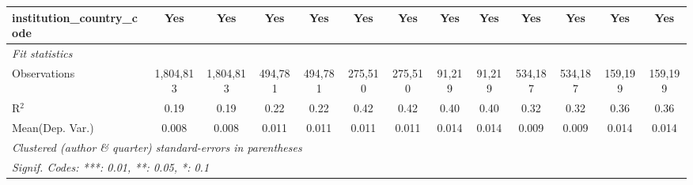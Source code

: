 \begin{tabular}{lcccccccccccc}
   institution\_country\_code               & Yes            & Yes            & Yes            & Yes             & Yes           & Yes           & Yes     & Yes           & Yes            & Yes            & Yes            & Yes\\  
   \midrule
   \emph{Fit statistics}\\
   Observations                             & 1,804,813      & 1,804,813      & 494,781        & 494,781         & 275,510       & 275,510       & 91,219  & 91,219        & 534,187        & 534,187        & 159,199        & 159,199\\  
   R$^2$                                    & 0.19           & 0.19           & 0.22           & 0.22            & 0.42          & 0.42          & 0.40    & 0.40          & 0.32           & 0.32           & 0.36           & 0.36\\  
Mean(Dep. Var.) & 0.008 & 0.008 & 0.011 & 0.011 & 0.011 & 0.011 & 0.014 & 0.014 & 0.009 & 0.009 & 0.014 & 0.014 \\
   \midrule \midrule
   \multicolumn{13}{l}{\emph{Clustered (author \& quarter) standard-errors in parentheses}}\\
   \multicolumn{13}{l}{\emph{Signif. Codes: ***: 0.01, **: 0.05, *: 0.1}}\\
\end{tabular}
\par\endgroup
